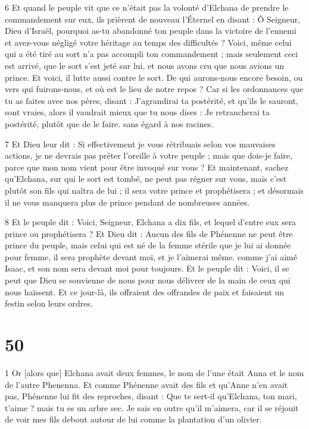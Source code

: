 \par 6 Et quand le peuple vit que ce n'était pas la volonté d'Elchana de prendre le commandement sur eux, ils prièrent de nouveau l'Éternel en disant : Ô Seigneur, Dieu d'Israël, pourquoi as-tu abandonné ton peuple dans la victoire de l'ennemi et avez-vous négligé votre héritage au temps des difficultés ? Voici, même celui qui a été tiré au sort n'a pas accompli ton commandement ; mais seulement ceci est arrivé, que le sort s'est jeté sur lui, et nous avons cru que nous avions un prince. Et voici, il lutte aussi contre le sort. De qui aurons-nous encore besoin, ou vers qui fuirons-nous, et où est le lieu de notre repos ? Car si les ordonnances que tu as faites avec nos pères, disant : J'agrandirai ta postérité, et qu'ils le sauront, sont vraies, alors il vaudrait mieux que tu nous dises : Je retrancherai ta postérité, plutôt que de le faire. sans égard à nos racines.

\par 7 Et Dieu leur dit : Si effectivement je vous rétribuais selon vos mauvaises actions, je ne devrais pas prêter l'oreille à votre peuple ; mais que dois-je faire, parce que mon nom vient pour être invoqué sur vous ? Et maintenant, sachez qu'Elchana, sur qui le sort est tombé, ne peut pas régner sur vous, mais c'est plutôt son fils qui naîtra de lui ; il sera votre prince et prophétisera ; et désormais il ne vous manquera plus de prince pendant de nombreuses années.

\par 8 Et le peuple dit : Voici, Seigneur, Elchana a dix fils, et lequel d'entre eux sera prince ou prophétisera ? Et Dieu dit : Aucun des fils de Phénenne ne peut être prince du peuple, mais celui qui est né de la femme stérile que je lui ai donnée pour femme, il sera prophète devant moi, et je l'aimerai même. comme j'ai aimé Isaac, et son nom sera devant moi pour toujours. Et le peuple dit : Voici, il se peut que Dieu se souvienne de nous pour nous délivrer de la main de ceux qui nous haïssent. Et ce jour-là, ils offraient des offrandes de paix et faisaient un festin selon leurs ordres.

\chapter{50}

\par 1 Or [alors que] Elchana avait deux femmes, le nom de l'une était Anna et le nom de l'autre Phenenna. Et comme Phénenne avait des fils et qu'Anne n'en avait pas, Phénenne lui fit des reproches, disant : Que te sert-il qu'Elchana, ton mari, t'aime ? mais tu es un arbre sec. Je sais en outre qu'il m'aimera, car il se réjouit de voir mes fils debout autour de lui comme la plantation d'un olivier.

